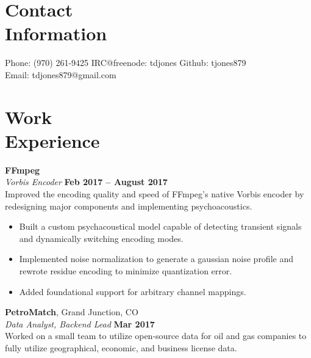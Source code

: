 \documentclass[margin,line]{resume}
\begin{document}
\begin{resume}
    \section{\mysidestyle Contact\\Information}

    Phone: (970) 261-9425 \hfill IRC@freenode: tdjones \hfill Github: tjones879 \\
    \noindent Email: tdjones879@gmail.com  \hfill \vspace{0mm}\\\vspace{-4.5mm}

    \section{\mysidestyle Work\\Experience}

    \textbf{FFmpeg} \vspace{2mm}\\\vspace{1mm}%
    \textsl{Vorbis Encoder} \hfill \textbf{Feb 2017 -- August 2017}\\
    Improved the encoding quality and speed of FFmpeg's native Vorbis
    encoder by redesigning major components and implementing
    psychoacoustics.

	\begin{itemize}
	\item Built a custom psychacoustical model capable of detecting
              transient signals and dynamically switching encoding modes.
	\item Implemented noise normalization to generate a gaussian noise
	      profile and rewrote residue encoding to minimize quantization
	      error.
	\item Added foundational support for arbitrary channel mappings.
	\end{itemize}

    \textbf{PetroMatch}, Grand Junction, CO \vspace{2mm}\\\vspace{1mm}%
    \textsl{Data Analyst, Backend Lead} \hfill \textbf{Mar 2017}\\
    Worked on a small team to utilize open-source data for oil and gas companies
    to fully utilize geographical, economic, and business license data.


\end{resume}
\end{document}
